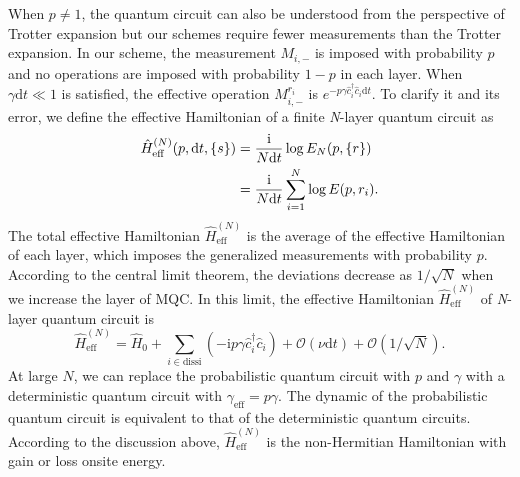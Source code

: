 \documentclass[longbibliography, aps, prx, amsmath, amssymb, amsfonts, twocolumn,superscriptaddress, footinbib]{revtex4-1}
\begin{document}
	When $p\neq1$, the quantum circuit can also be understood from the perspective of Trotter expansion but our schemes require fewer measurements than the Trotter expansion. In our scheme, the measurement $M_{i,-}$ is imposed with probability $p$ and no operations are imposed with probability $1-p$ in each layer. When $\gamma \mathrm{d}t\ll 1$ is satisfied, the effective operation $M_{i,-}^{r_i}$ is $e^{-p \gamma \hat{c}_i^{\dagger} \hat{c}_i \mathrm{d}t} $. To clarify it and its error, we define the effective Hamiltonian of a finite \textit{N}-layer quantum circuit as 
	\begin{align}
		\hat{H}^{(N)}_{\text{eff}} (p,\mathrm{d}t, \{s\}) &= \frac{\mathrm{i}}{N\mathrm{d}t} \log{E_N(p, \{r\})} \notag\\
		&= \frac{\mathrm{i}}{N\mathrm{d}t} \sum_{i=1}^N \log{E(p,r_i)}.
	\end{align}
	The total effective Hamiltonian $\hat{H}^{(N)}_{\text{eff}}$ is the average of the effective Hamiltonian of each layer, which imposes the generalized measurements with probability $p$. According to the central limit theorem, the deviations decrease as $1/\sqrt{N}$ when we increase the layer of MQC. In this limit, the effective 
	Hamiltonian $\hat{H}^{(N)}_{\text{eff}}$ of \textit{N}-layer quantum circuit is 
	\begin{equation}
		\hat{H}^{(N)}_{\text{eff}} = \hat{H}_0 + \sum_{i\in \text{dissi} } (-\mathrm{i} p\gamma \hat{c}_i^{\dagger} \hat{c}_i) + \mathcal{O}(\nu\mathrm{d} t) + \mathcal{O}(1/\sqrt{N}).
	\end{equation}
	At large $N$, we can replace the probabilistic quantum circuit with $p$ and $\gamma$ with a deterministic quantum circuit with $\gamma_{\text{eff}} = p \gamma$. The dynamic of the probabilistic quantum circuit is equivalent to that of the deterministic quantum circuits. According to the discussion above, $\hat{H}^{(N)}_{\text{eff}}$ is the non-Hermitian Hamiltonian with gain or loss onsite energy. 
	
	
\end{document}

